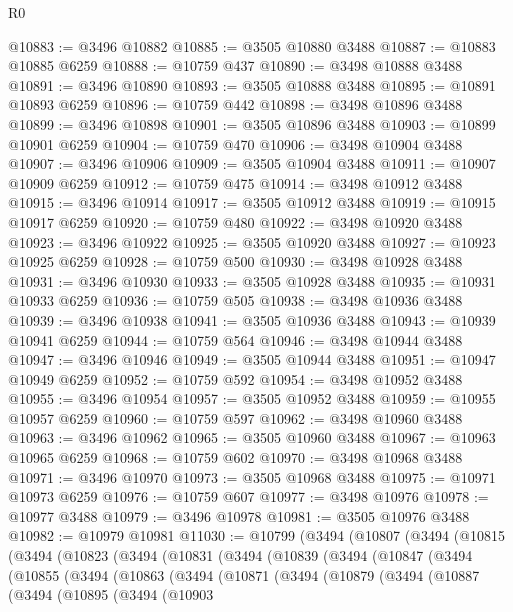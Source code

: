 \begin{lexlean}{R0}
\begin{coremodule}
@10883 := @3496 @10882
@10885 := @3505 @10880 @3488
@10887 := @10883 @10885 @6259
@10888 := @10759 @437
@10890 := @3498 @10888 @3488
@10891 := @3496 @10890
@10893 := @3505 @10888 @3488
@10895 := @10891 @10893 @6259
@10896 := @10759 @442
@10898 := @3498 @10896 @3488
@10899 := @3496 @10898
@10901 := @3505 @10896 @3488
@10903 := @10899 @10901 @6259
@10904 := @10759 @470
@10906 := @3498 @10904 @3488
@10907 := @3496 @10906
@10909 := @3505 @10904 @3488
@10911 := @10907 @10909 @6259
@10912 := @10759 @475
@10914 := @3498 @10912 @3488
@10915 := @3496 @10914
@10917 := @3505 @10912 @3488
@10919 := @10915 @10917 @6259
@10920 := @10759 @480
@10922 := @3498 @10920 @3488
@10923 := @3496 @10922
@10925 := @3505 @10920 @3488
@10927 := @10923 @10925 @6259
@10928 := @10759 @500
@10930 := @3498 @10928 @3488
@10931 := @3496 @10930
@10933 := @3505 @10928 @3488
@10935 := @10931 @10933 @6259
@10936 := @10759 @505
@10938 := @3498 @10936 @3488
@10939 := @3496 @10938
@10941 := @3505 @10936 @3488
@10943 := @10939 @10941 @6259
@10944 := @10759 @564
@10946 := @3498 @10944 @3488
@10947 := @3496 @10946
@10949 := @3505 @10944 @3488
@10951 := @10947 @10949 @6259
@10952 := @10759 @592
@10954 := @3498 @10952 @3488
@10955 := @3496 @10954
@10957 := @3505 @10952 @3488
@10959 := @10955 @10957 @6259
@10960 := @10759 @597
@10962 := @3498 @10960 @3488
@10963 := @3496 @10962
@10965 := @3505 @10960 @3488
@10967 := @10963 @10965 @6259
@10968 := @10759 @602
@10970 := @3498 @10968 @3488
@10971 := @3496 @10970
@10973 := @3505 @10968 @3488
@10975 := @10971 @10973 @6259
@10976 := @10759 @607
@10977 := @3498 @10976
@10978 := @10977 @3488
@10979 := @3496 @10978
@10981 := @3505 @10976 @3488
@10982 := @10979 @10981
@11030 := @10799
    (@3494
      (@10807
        (@3494
          (@10815
            (@3494
              (@10823
                (@3494
                  (@10831
                    (@3494
                      (@10839
                        (@3494
                          (@10847
                            (@3494
                              (@10855
                                (@3494
                                  (@10863
                                    (@3494
                                      (@10871
                                        (@3494
                                          (@10879
                                            (@3494
                                              (@10887
                                                (@3494
                                                  (@10895
                                                    (@3494
                                                      (@10903

\end{coremodule}
\end{lexlean}
